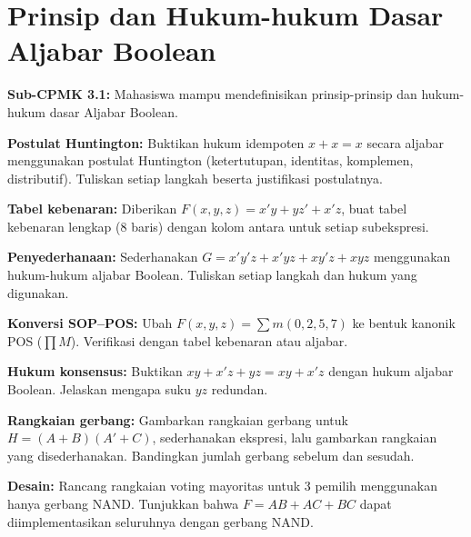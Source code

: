\documentclass[../main]{subfiles}
\begin{document}
\chapter{Prinsip dan Hukum-hukum Dasar Aljabar Boolean}

\begin{subcpmk}
  \item \textbf{Sub-CPMK 3.1:} Mahasiswa mampu mendefinisikan prinsip-prinsip dan hukum-hukum dasar Aljabar Boolean.
\end{subcpmk}










\begin{aktivitas}
  \item \textbf{Postulat Huntington:} Buktikan hukum idempoten $x + x = x$ secara aljabar menggunakan postulat Huntington (ketertutupan, identitas, komplemen, distributif). Tuliskan setiap langkah beserta justifikasi postulatnya.
  \item \textbf{Tabel kebenaran:} Diberikan $F(x,y,z) = x'y + yz' + x'z$, buat tabel kebenaran lengkap (8 baris) dengan kolom antara untuk setiap subekspresi.
  \item \textbf{Penyederhanaan:} Sederhanakan $G = x'y'z + x'yz + xy'z + xyz$ menggunakan hukum-hukum aljabar Boolean. Tuliskan setiap langkah dan hukum yang digunakan.
  \item \textbf{Konversi SOP--POS:} Ubah $F(x,y,z) = \sum m(0, 2, 5, 7)$ ke bentuk kanonik POS ($\prod M$). Verifikasi dengan tabel kebenaran atau aljabar.
  \item \textbf{Hukum konsensus:} Buktikan $xy + x'z + yz = xy + x'z$ dengan hukum aljabar Boolean. Jelaskan mengapa suku $yz$ redundan.
  \item \textbf{Rangkaian gerbang:} Gambarkan rangkaian gerbang untuk $H = (A + B)(A' + C)$, sederhanakan ekspresi, lalu gambarkan rangkaian yang disederhanakan. Bandingkan jumlah gerbang sebelum dan sesudah.
  \item \textbf{Desain:} Rancang rangkaian voting mayoritas untuk 3 pemilih menggunakan hanya gerbang NAND. Tunjukkan bahwa $F = AB + AC + BC$ dapat diimplementasikan seluruhnya dengan gerbang NAND.
\end{aktivitas}
\end{document}
